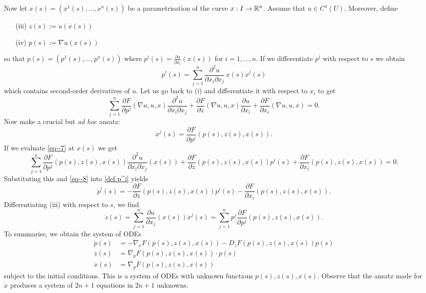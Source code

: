 \documentclass[11pt]{article}
\begin{document}
			Now let $x(s)=(x^1(s),\dots,x^n(s))$ be a parametrisation of the curve $x:I\rightarrow\mathbb{R}^n$. Assume that $u\in C^1(U)$. Moreover, define
			\begin{enumerate}
				\item[(iii)] $z(s):=u(x(s))$
				\item[(iv)] $p(s):=\nabla u(x(s))$
			\end{enumerate}
			so that $p(s)=(p^1(s),\dots,p^n(s))$ where $p^i(s)=\frac{\partial u}{\partial x_i}(x(s))$ for $i=1,\dots,n$. If we differentiate $p^i$ with respect to $s$ we obtain
			\begin{equation}\label{def p^i}
				\dot{p}^i(s)=\sum_{j=1}^n\frac{\partial^2 u}{\partial x_i\partial x_j}\,x(s)\dot{x}^j(s)
			\end{equation}
			which contains second-order derivatives of $u$. Let us go back to (i) and differentiate it with respect to $x_i$ to get 
			\begin{equation}\label{eq--7}
				\sum_{j=1}^n\frac{\partial F}{\partial p^j}(\nabla u,u,x)\frac{\partial^2 u}{\partial x_i\partial x_j}+\frac{\partial F}{\partial z}(\nabla u,u,x)\frac{\partial u}{\partial x_i}+\frac{\partial F}{\partial x_i}(\nabla u,u,x)=0.
			\end{equation}
			Now make a crucial but \textit{ad hoc} ansatz:
			\begin{equation}\label{eq--8}
				\dot{x}^j(s)=\frac{\partial F}{\partial p^j}(p(s),z(s),x(s)).
			\end{equation}
			If we evaluate \eqref{eq--7} at $x(s)$ we get
			\begin{equation*}
				\sum_{j=1}^n\frac{\partial F}{\partial p^j}(p(s),z(s),x(s))\frac{\partial^2 u}{\partial x_i\partial x_j}(x(s))+\frac{\partial F}{\partial z}(p(s),z(s),x(s))p^i(s)+\frac{\partial F}{\partial x_i}(p(s),z(s),x(s))=0.
			\end{equation*}
			Substituting this and \eqref{eq--8} into \eqref{def p^i} yields
			\begin{equation}\label{eq--9}
				\dot{p}^i(s)=-\frac{\partial F}{\partial z}(p(s),z(s),x(s))p^i(s)-\frac{\partial F}{\partial x_i}(p(s),z(s),x(s)).
			\end{equation}
			Differentiating (iii) with respect to $s$, we find 
			\begin{equation*}
				\dot{z}(s)=\sum_{j=1}^n\frac{\partial u}{\partial x_j}(x(s))\dot{x}^j(s)=\sum_{j=1}^np^j\frac{\partial F}{\partial p^j}(p(s),z(s),x(s)).
			\end{equation*}
			To summarise, we obtain the system of ODEs
			\begin{align}
				\dot{p}(s)&=-\nabla_xF(p(s),z(s),x(s))-D_zF(p(s),z(s),x(s))p(s)\label{eq--start}\\
				\dot{z}(s)&=\nabla_pF(p(s),z(s),x(s))\cdot p(s)\\
				\dot{x}(s)&=\nabla_pF(p(s),z(s),x(s))\label{eq--stop}
			\end{align}
			subject to the initial conditions. This is a system of ODEs with unknown functions $p(s),z(s),x(s)$. Observe that the ansatz made for $\dot{x}$ produces a system of $2n+1$ equations in $2n+1$ unknowns. 
\end{document}
